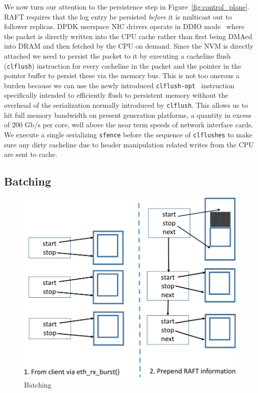 \documentclass[pageno]{jpaper}
\begin{document}
We now turn our attention to the persistence step in
Figure~\ref{fig:control_plane}. RAFT requires that the log entry be persisted
\emph{before} it is multicast out to follower replicas. DPDK userspace NIC
drivers operate in DDIO mode~\cite{ddio} where the packet is directly written
into the CPU cache rather than first being DMAed into DRAM and then fetched by
the CPU on demand. Since the NVM is directly attached we need to persist the
packet to it by executing a cacheline flush ({\tt clflush}) instruction for
every cacheline in the packet and the pointer in the pointer buffer to persist
these via the memory bus. This is not too onerous a burden because we can use
the newly introduced {\tt clflush-opt}~\cite{clflush_opt} instruction
specifically intended to efficiently flush to persistent memory without the
overhead of the serialization normally introduced by {\tt clflush}. This allows
us to hit full memory bandwidth on present generation platforms, a quantity in
excess of 200 Gb/s per core, well above the near term speeds of network
interface cards. We execute a single serializing {\tt sfence} before the
sequence of {\tt clflushes} to make sure any dirty cacheline due to header
manipulation related writes from the CPU are sent to cache.

\subsection{Batching}

\begin{figure}
  \centering
  \includegraphics[scale=0.4]{figures2/batching.pdf}
  \caption{Batching}
  \label{fig:batching}
\end{figure}
\end{document}
